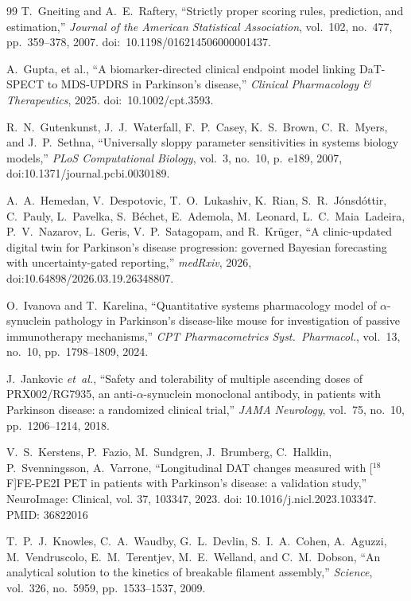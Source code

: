\begin{thebibliography}{99}
T.~Gneiting and A.~E.~Raftery, ``Strictly proper scoring rules, prediction, and estimation,'' \textit{Journal of the American Statistical Association}, vol.~102, no.~477, pp.~359--378, 2007. doi:~10.1198/016214506000001437.

A.~Gupta, et al., ``A biomarker-directed clinical endpoint model linking DaT-SPECT to MDS-UPDRS in Parkinson's disease,'' \textit{Clinical Pharmacology \& Therapeutics}, 2025. doi:~10.1002/cpt.3593.

R.~N.~Gutenkunst, J.~J.~Waterfall, F.~P.~Casey, K.~S.~Brown, C.~R.~Myers, and J.~P.~Sethna, ``Universally sloppy parameter sensitivities in systems biology models,'' \textit{PLoS Computational Biology}, vol.~3, no.~10, p.~e189, 2007, doi:10.1371/journal.pcbi.0030189.


A.~A.~Hemedan, V.~Despotovic, T.~O.~Lukashiv, K.~Rian, S.~R.~J{\'o}nsd{\'o}ttir, C.~Pauly, L.~Pavelka, S.~B{\'e}chet, E.~Ademola, M.~Leonard, L.~C.~Maia~Ladeira, P.~V.~Nazarov, L.~Geris, V.~P.~Satagopam, and R.~Kr{\"u}ger, ``A clinic-updated digital twin for Parkinson's disease progression: governed Bayesian forecasting with uncertainty-gated reporting,'' \textit{medRxiv}, 2026, doi:10.64898/2026.03.19.26348807.

O.~Ivanova and T.~Karelina, ``Quantitative systems pharmacology model of $\alpha$-synuclein pathology in Parkinson's disease-like mouse for investigation of passive immunotherapy mechanisms,'' \textit{CPT Pharmacometrics Syst.\ Pharmacol.}, vol.~13, no.~10, pp.~1798--1809, 2024.


J.~Jankovic \textit{et~al.}, ``Safety and tolerability of multiple ascending doses of PRX002/RG7935, an anti-$\alpha$-synuclein monoclonal antibody, in patients with Parkinson disease: a randomized clinical trial,'' \textit{JAMA Neurology}, vol.~75, no.~10, pp.~1206--1214, 2018.

 V.~S.~Kerstens, P.~Fazio, M.~Sundgren, J.~Brumberg, C.~Halldin, P.~Svenningsson, A.~Varrone, ``Longitudinal DAT changes measured with [$^{18}$F]FE-PE2I PET in patients with Parkinson's disease: a validation study,'' NeuroImage: Clinical, vol. 37, 103347, 2023. doi: 10.1016/j.nicl.2023.103347. PMID: 36822016

T.~P.~J.~Knowles, C.~A.~Waudby, G.~L.~Devlin, S.~I.~A.~Cohen, A.~Aguzzi, M.~Vendruscolo, E.~M.~Terentjev, M.~E.~Welland, and C.~M.~Dobson, ``An analytical solution to the kinetics of breakable filament assembly,'' \textit{Science}, vol.~326, no.~5959, pp.~1533--1537, 2009.


\end{thebibliography}
